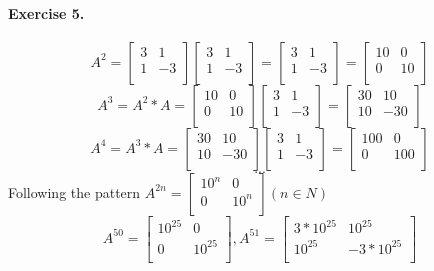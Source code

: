 \documentclass{article}
\begin{document}
\paragraph{Exercise 5.}
\[
A^2=
\begin{bmatrix}
    3 & 1\\
    1 & -3\\
\end{bmatrix}
\begin{bmatrix}
    3 & 1\\
    1 & -3\\
\end{bmatrix}
=
\begin{bmatrix}
    3 & 1\\
    1 & -3\\
\end{bmatrix}
=
\begin{bmatrix}
    10 & 0\\
    0 & 10\\
\end{bmatrix}
\]
\[
A^3=A^2*A=
\begin{bmatrix}
    10 & 0\\
    0 & 10\\
\end{bmatrix}
\begin{bmatrix}
    3 & 1\\
    1 & -3\\
\end{bmatrix}
=
\begin{bmatrix}
    30 & 10\\
    10 & -30\\
\end{bmatrix}
\]
\[
A^4=A^3*A=
\begin{bmatrix}
    30 & 10\\
    10 & -30\\
\end{bmatrix}
\begin{bmatrix}
    3 & 1\\
    1 & -3\\
\end{bmatrix}
=
\begin{bmatrix}
    100 & 0\\
    0 & 100\\
\end{bmatrix}
\]
\[...\]
Following the pattern $A^{2n}=
\begin{bmatrix}
    10^n & 0\\
    0 & 10^n\\
\end{bmatrix}
(n\in N)
$\\
\[A^{50}=
\begin{bmatrix}
    10^{25} & 0\\
    0 & 10^{25}\\
\end{bmatrix}
,A^{51}=
\begin{bmatrix}
    3*10^{25} & 10^{25}\\
    10^{25} & -3*10^{25}\\
\end{bmatrix}
\]
\end{document}
